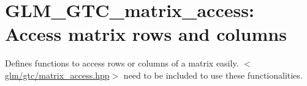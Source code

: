 \hypertarget{group__gtc__matrix__access}{\section{\-G\-L\-M\-\_\-\-G\-T\-C\-\_\-matrix\-\_\-access\-: \-Access matrix rows and columns}
\label{group__gtc__matrix__access}
}
\-Defines functions to access rows or columns of a matrix easily. $<$\hyperlink{matrix__access_8hpp}{glm/gtc/matrix\-\_\-access.\-hpp}$>$ need to be included to use these functionalities. 